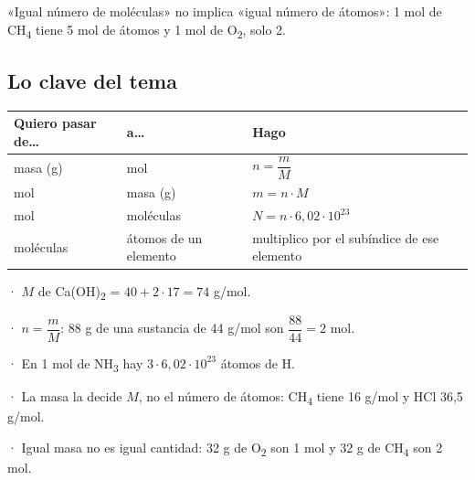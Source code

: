 \begin{ojo}[{Ojo}] «Igual número de moléculas» no implica «igual número de átomos»: 1 mol de CH\textsubscript{4} tiene 5 mol de átomos y 1 mol de O\textsubscript{2}, solo 2.\end{ojo}
\subsection{Lo clave del tema}
\begin{center}\small
\begin{tabularx}{\linewidth}{@{}>{\raggedright\arraybackslash\hsize=0.62\hsize}X>{\raggedright\arraybackslash\hsize=0.82\hsize}X>{\raggedright\arraybackslash\hsize=1.56\hsize}X@{}}
\toprule
\textbf{Quiero pasar de\dots{}} & \textbf{a\dots{}} & \textbf{Hago} \\
\midrule
masa (g) & mol & $n = \dfrac{m}{M}$ \\
mol & masa (g) & $m = n\cdot M$ \\
mol & moléculas & $N = n\cdot 6{,}02\cdot 10^{23}$ \\
moléculas & átomos de un elemento & multiplico por el subíndice de ese elemento \\
\bottomrule
\end{tabularx}
\end{center}
 
\begin{clave}[{Recuerda}] · $M$ de Ca(OH)\textsubscript{2} = $40 + 2\cdot 17 = 74$ g/mol.\par · $n = \dfrac{m}{M}$: 88 g de una sustancia de 44 g/mol son $\dfrac{88}{44} = 2$ mol.\par · En 1 mol de NH\textsubscript{3} hay $3\cdot 6{,}02\cdot 10^{23}$ átomos de H.\par · La masa la decide $M$, no el número de átomos: CH\textsubscript{4} tiene 16 g/mol y HCl 36,5 g/mol.\par · Igual masa no es igual cantidad: 32 g de O\textsubscript{2} son 1 mol y 32 g de CH\textsubscript{4} son 2 mol.\end{clave}
 

